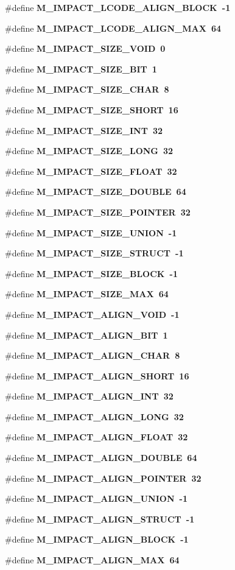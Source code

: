 \begin{CompactItemize}
\#define \bf{M\_\-IMPACT\_\-LCODE\_\-ALIGN\_\-BLOCK}~-1
\item 
\#define \bf{M\_\-IMPACT\_\-LCODE\_\-ALIGN\_\-MAX}~64
\item 
\#define \bf{M\_\-IMPACT\_\-SIZE\_\-VOID}~0
\item 
\#define \bf{M\_\-IMPACT\_\-SIZE\_\-BIT}~1
\item 
\#define \bf{M\_\-IMPACT\_\-SIZE\_\-CHAR}~8
\item 
\#define \bf{M\_\-IMPACT\_\-SIZE\_\-SHORT}~16
\item 
\#define \bf{M\_\-IMPACT\_\-SIZE\_\-INT}~32
\item 
\#define \bf{M\_\-IMPACT\_\-SIZE\_\-LONG}~32
\item 
\#define \bf{M\_\-IMPACT\_\-SIZE\_\-FLOAT}~32
\item 
\#define \bf{M\_\-IMPACT\_\-SIZE\_\-DOUBLE}~64
\item 
\#define \bf{M\_\-IMPACT\_\-SIZE\_\-POINTER}~32
\item 
\#define \bf{M\_\-IMPACT\_\-SIZE\_\-UNION}~-1
\item 
\#define \bf{M\_\-IMPACT\_\-SIZE\_\-STRUCT}~-1
\item 
\#define \bf{M\_\-IMPACT\_\-SIZE\_\-BLOCK}~-1
\item 
\#define \bf{M\_\-IMPACT\_\-SIZE\_\-MAX}~64
\item 
\#define \bf{M\_\-IMPACT\_\-ALIGN\_\-VOID}~-1
\item 
\#define \bf{M\_\-IMPACT\_\-ALIGN\_\-BIT}~1
\item 
\#define \bf{M\_\-IMPACT\_\-ALIGN\_\-CHAR}~8
\item 
\#define \bf{M\_\-IMPACT\_\-ALIGN\_\-SHORT}~16
\item 
\#define \bf{M\_\-IMPACT\_\-ALIGN\_\-INT}~32
\item 
\#define \bf{M\_\-IMPACT\_\-ALIGN\_\-LONG}~32
\item 
\#define \bf{M\_\-IMPACT\_\-ALIGN\_\-FLOAT}~32
\item 
\#define \bf{M\_\-IMPACT\_\-ALIGN\_\-DOUBLE}~64
\item 
\#define \bf{M\_\-IMPACT\_\-ALIGN\_\-POINTER}~32
\item 
\#define \bf{M\_\-IMPACT\_\-ALIGN\_\-UNION}~-1
\item 
\#define \bf{M\_\-IMPACT\_\-ALIGN\_\-STRUCT}~-1
\item 
\#define \bf{M\_\-IMPACT\_\-ALIGN\_\-BLOCK}~-1
\item 
\#define \bf{M\_\-IMPACT\_\-ALIGN\_\-MAX}~64
\item 

\end{CompactItemize}

